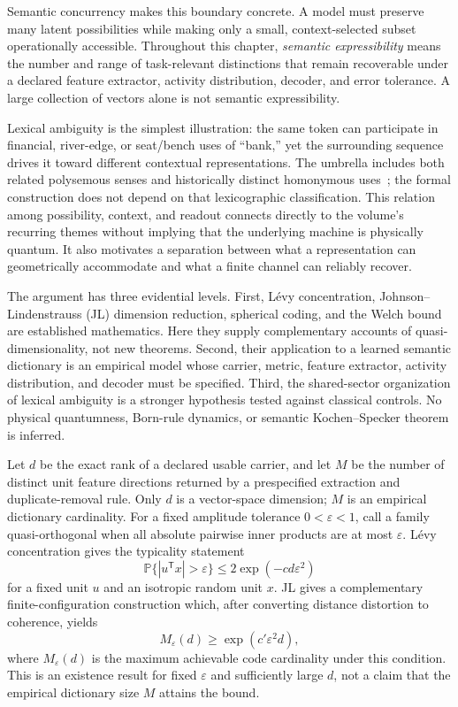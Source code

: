 \documentclass[
  aps,
  reprint,
  superscriptaddress,
  floatfix,
  nofootinbib,
  longbibliography
]{revtex4-2}
\newcommand{\Prob}{\mathbb{P}}
\newcommand{\Msem}{M}
\newcommand{\T}{^{\mathsf{T}}}
\begin{document}
Semantic concurrency makes this boundary concrete.  A model must preserve
many latent possibilities while making only a small, context-selected subset
operationally accessible.  Throughout this chapter, \emph{semantic
expressibility} means the number and range of task-relevant distinctions that
remain recoverable under a declared feature extractor, activity distribution,
decoder, and error tolerance.  A large collection of vectors alone is not
semantic expressibility.

Lexical ambiguity is the simplest illustration: the same token can
participate in financial, river-edge, or seat/bench uses of ``bank,'' yet the
surrounding sequence drives it toward different contextual representations.
The umbrella includes both related polysemous senses and historically distinct
homonymous uses~\cite{pustejovsky1995}; the formal construction does not depend
on that lexicographic classification.  This relation among possibility,
context, and readout
connects directly to the volume's recurring themes without implying that the
underlying machine is physically quantum.  It also motivates a separation
between what a representation can geometrically accommodate and what a
finite channel can reliably recover.



The argument has three evidential levels.  First, L\'evy concentration,
Johnson--Lindenstrauss (JL) dimension reduction, spherical coding, and the
Welch bound are established mathematics.  Here they supply complementary
accounts of quasi-dimensionality, not new theorems.  Second, their application
to a learned semantic dictionary is an empirical model whose carrier, metric,
feature extractor, activity distribution, and decoder must be specified.
Third, the shared-sector organization of lexical ambiguity is a stronger hypothesis
tested against classical controls.  No physical quantumness, Born-rule
dynamics, or semantic Kochen--Specker theorem is inferred.

Let $d$ be the exact rank of a declared usable carrier, and let $\Msem$ be the
number of distinct unit feature directions returned by a prespecified
extraction and duplicate-removal rule.  Only $d$ is a vector-space dimension;
$\Msem$ is an empirical dictionary cardinality.  For a fixed amplitude
tolerance $0<\varepsilon<1$, call a family quasi-orthogonal when all absolute
pairwise inner products are at most $\varepsilon$.  L\'evy concentration gives
the typicality statement
%
\begin{equation}
\label{eq:intro-levy}
\Prob\{|u\T x|>\varepsilon\}
\leq 2\exp(-c d\varepsilon^2)
\end{equation}
%
for a fixed unit $u$ and an isotropic random unit $x$.  JL gives a complementary
finite-configuration construction which, after converting distance distortion
to coherence, yields
%
\begin{equation}
\label{eq:intro-jl}
M_\varepsilon(d)\geq\exp(c'\varepsilon^2d),
\end{equation}
%
where $M_\varepsilon(d)$ is the maximum achievable code cardinality under this
condition.  This is an existence result for fixed $\varepsilon$ and
sufficiently large $d$, not a claim that the empirical dictionary size
$\Msem$ attains the bound.
\end{document}
